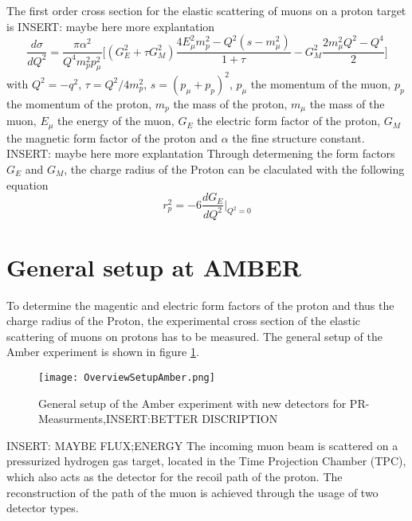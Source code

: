The first order cross section for the elastic scattering of muons on a proton target is \autocite{intentAmber}
INSERT: maybe  here more explantation 
\begin{equation}
\label{eq:cross_section}
\frac{d\sigma}{dQ^2} = \frac{\pi \alpha^2}{Q^4 m_p^2 p_\mu^2} \bigg[ \left( G_E^2 + \tau G_M^2 \right) \frac{ 4E_\mu^2 m_p^2 - Q^2 (s - m_\mu^2)}{1 + \tau }  - G_M^2 \frac{ 2m_\mu^2 Q^2 - Q^4}{2} \bigg]
\end{equation}
with  $Q^2 = -q^2$, $\tau = Q^2 / 4m_p^2$, $s = (p_\mu + p_p)^2$, $p_\mu$ the momentum of the muon, $p_p$ the momentum of the proton, $m_p$ the mass of the proton,
 $m_\mu$ the mass of the muon, $E_\mu$ the energy of the muon, $G_E$ the electric form factor of the proton,
  $G_M$ the magnetic form factor of the proton and $\alpha$ the fine structure constant.
  INSERT: maybe  here more explantation 
Through determening the form factors $G_E$ and $G_M$, the charge radius of the Proton can be claculated with the following equation \autocite{intentAmber}
\begin{equation}
\label{eq:charge_radius}
r_p^2 = -6 \frac{dG_E}{dQ^2} \bigg|_{Q^2 = 0}
\end{equation}

\section{General setup  at AMBER}\label{sec:general_setup}
To determine the magentic and electric form factors of the proton and thus the charge radius of the Proton, the experimental cross section of the elastic scattering of muons on protons has to be measured.
The general setup of the Amber experiment is shown in figure \ref{fig:amber_setup}.
\begin{figure}[h]
	\centering
	\texttt{[image: OverviewSetupAmber.png]}
	\caption{General setup of the Amber experiment with new detectors for PR-Measurments,INSERT:BETTER DISCRIPTION \autocite{ProposalAmber}}
	\label{fig:amber_setup}
\end{figure}
INSERT: MAYBE FLUX;ENERGY
The incoming muon beam is scattered on a pressurized hydrogen gas target, located in the Time Projection Chamber (TPC), which also acts as the detector for the recoil path of the proton.
The reconstruction of the path of the muon is achieved through the usage of two detector types.


